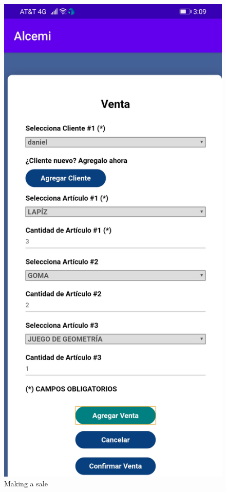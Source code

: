 \documentclass{article}
\begin{document}
\begin{figure}[h]
\begin{minipage}[t]{0.5\linewidth}
\end{minipage}
\begin{minipage}[t]{0.5\linewidth}
\caption {Making a sale}
\centering
\includegraphics[scale=0.16]{fig13}
\end{minipage}
\end{figure}
\end{document}
